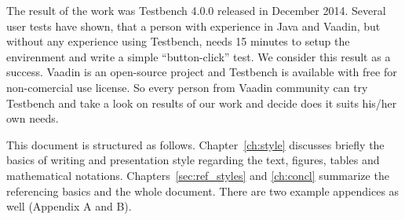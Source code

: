 	  The result of the work was Testbench 4.0.0 released in December 2014.
	  Several user tests have shown, that a person with experience in Java and
	  Vaadin, but without any experience using Testbench, needs 15 minutes to setup
	  the envirenment and write a simple ``button-click'' test. We consider this
	  result as a success. Vaadin is an open-source project and Testbench is
	  available with free for non-comercial use license. So every person from Vaadin community can try
	  Testbench and take a look on results of our work and decide does it suits
	  his/her own needs.
	  
	  This document is structured as follows. Chapter~\ref{ch:style}
	  discusses briefly the basics of writing and presentation style
	  regarding the text, figures, tables and mathematical
	  notations. Chapters~\ref{sec:ref_styles} and \ref{ch:concl} summarize
	   the referencing basics and the whole document. There are two example
	appendices as well (Appendix A and B).
